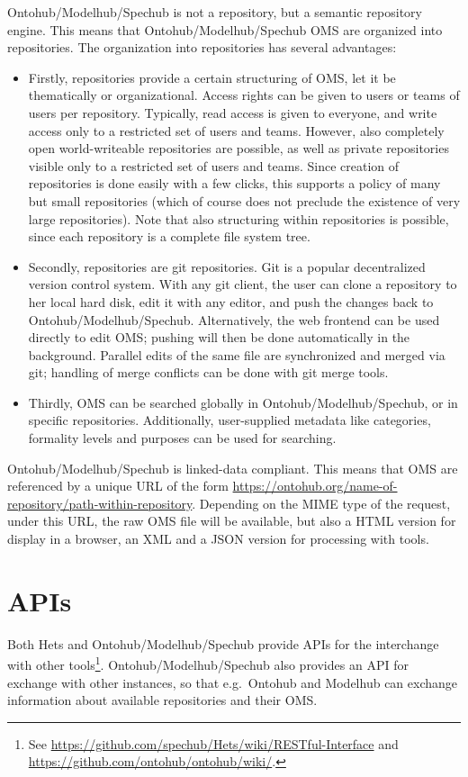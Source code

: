 \documentclass[10pt,fleqn,%
\ifpretendfinal
final%
\else
draft%
\fi,
]{scrreprt}
\newcommand{\sclause}[1]{\section{#1}}
\begin{document}
Ontohub/Modelhub/Spechub is not a repository, but a semantic repository engine. This
means that Ontohub/Modelhub/Spechub OMS are organized into repositories.
The
organization into repositories has several advantages:
\begin{itemize}
\item
 Firstly, repositories provide a certain structuring of OMS,
 let it be thematically or organizational. Access rights can be given
 to users or teams of users per repository. Typically, read access is
 given to everyone, and write access only to a restricted set of users
 and teams. However, also completely open world-writeable repositories
 are possible, as well as private repositories visible only to a
 restricted set of users and teams.  Since creation of repositories is
 done easily with a few clicks, this supports a policy of many but
 small repositories (which of course does not preclude the existence
 of very large repositories). Note that also structuring within
 repositories is possible, since each repository is a complete file
 system tree.
 
\item
 Secondly, repositories are git repositories. Git is a popular
 decentralized version control system. With any git client, the user
 can clone a repository to her local hard disk, edit it
 with any editor, and push the changes back to Ontohub/Modelhub/Spechub. Alternatively,
 the web frontend can be used directly to edit OMS; pushing
 will then be done automatically in the background. Parallel edits of
 the same file are synchronized and merged via git; handling of
 merge conflicts can be done with git merge tools.
\item
Thirdly, OMS can be searched globally in Ontohub/Modelhub/Spechub, or in
specific repositories. Additionally, user-supplied metadata like
categories, formality levels and purposes can be used for searching.
\end{itemize}

Ontohub/Modelhub/Spechub is linked-data compliant. This means that OMS are
referenced by a unique URL of the form
\url{https://ontohub.org/name-of-repository/path-within-repository}. Depending
on the MIME type of the request, under this URL, the raw OMS file
will be available, but also a HTML version for display in a browser, 
an XML and a JSON version for processing with tools.

\sclause{APIs}\label{c:APIs}

Both Hets and Ontohub/Modelhub/Spechub provide APIs for the interchange
with other tools\footnote{See \url{https://github.com/spechub/Hets/wiki/RESTful-Interface} and \url{https://github.com/ontohub/ontohub/wiki/}.}. Ontohub/Modelhub/Spechub also provides an API for
exchange with other instances, so that e.g.\ Ontohub and Modelhub
can exchange information about available repositories and their OMS.
\end{document}

